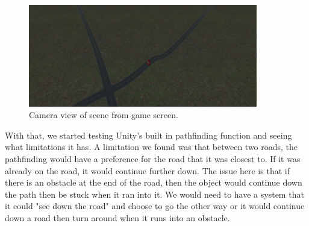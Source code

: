 \begin{figure}[!ht]
    \centering
    \includegraphics[width=10cm]{../Images/Update4/GameView.png}
       \caption{Camera view of scene from game screen.}
           \label{Fig:Gameview}
\end{figure}

\begin{flushleft}
With that, we started testing Unity's built in pathfinding function and seeing what limitations it has. A limitation we found was that between two roads, the pathfinding would have a preference for the road that it was closest to. If it was already on the road, it would continue further down. The issue here is that if there is an obstacle at the end of the road, then the object would continue down the path then be stuck when it ran into it. We would need to have a system that it could "see down the road" and choose to go the other way or it would continue down a road then turn around when it runs into an obstacle.
\end{flushleft}